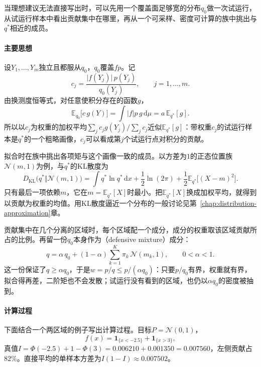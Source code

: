 当理想建议无法直接写出时，可以先用一个覆盖面足够宽的分布$q_0$做一次试运行，从试运行样本中看出贡献集中在哪里，再从一个可采样、密度可计算的族中挑出与$q^{*}$相近的成员。

\paragraph{主要思想}
设$Y_1,\dots,Y_m$独立且都服从$q_0$，$q_0$覆盖$fp$。记
\begin{equation}
 c_j=\frac{\lvert f(Y_j)\rvert\,p(Y_j)}{q_0(Y_j)},\qquad j=1,\dots,m .
 \label{eq:vr-pilot-contribution}
\end{equation}
由换测度恒等式，对任意使积分存在的函数$g$，
\[
 \mathbb{E}_{q_0}\bigl[c\,g(Y)\bigr]=\int\lvert f\rvert p\,g\,\mathrm{d}\mu=a\,\mathbb{E}_{q^{*}}[g] .
\]
所以以$c_j$为权重的加权平均$\sum_j c_jg(Y_j)/\sum_j c_j$近似$\mathbb{E}_{q^{*}}[g]$：带权重$c_j$的试运行样本是$q^{*}$的一个粗略画像，$c_j$可以看成第$j$个试运行点对积分的贡献。

拟合时在族中挑出各项矩与这个画像一致的成员。以方差为$1$的正态位置族$\mathcal{N}(m,1)$为例，与$q^{*}$的KL散度为
\[
 D_{\mathrm{KL}}\bigl(q^{*}\Vert\mathcal{N}(m,1)\bigr)=\int q^{*}\ln q^{*}\,\mathrm{d}x+\frac12\ln(2\pi)+\frac12\mathbb{E}_{q^{*}}\bigl[(X-m)^2\bigr] .
\]
只有最后一项依赖$m$，它在$m=\mathbb{E}_{q^{*}}[X]$时最小。把$\mathbb{E}_{q^{*}}[X]$换成加权平均，就得到以贡献为权重的均值。用KL散度逼近一个分布的一般讨论见第~\ref{chap:distribution-approximation}章。

贡献集中在几个分离的区域时，每个区域配一个成分，成分的权重取该区域贡献所占的比例。再留一份$q_0$本身作为（defensive mixture）成分：
\begin{equation}
 q=\alpha\,q_0+(1-\alpha)\sum_{k=1}^{K}\pi_k\,\mathcal{N}(m_k,1),\qquad 0<\alpha<1 .
 \label{eq:vr-defensive-mixture}
\end{equation}
这一份保证了$q\geq\alpha q_0$，于是$w=p/q\leq p/(\alpha q_0)$：只要$p/q_0$有界，权重就有界，拟合得再差，二阶矩也不会发散；试运行没有看到的区域，也仍以$\alpha q_0$的密度被抽到。

\paragraph{计算过程}
下面结合一个两区域的例子写出计算过程。目标$P=\mathcal{N}(0,1)$，
\[
 f(x)=\mathbf{1}_{\{x<-2.5\}}+\mathbf{1}_{\{x>3\}} ,
\]
真值$I=\Phi(-2.5)+1-\Phi(3)=0.006210+0.001350=0.007560$，左侧贡献占$82\%$。直接平均的单样本方差为$I(1-I)\approx0.007502$。

